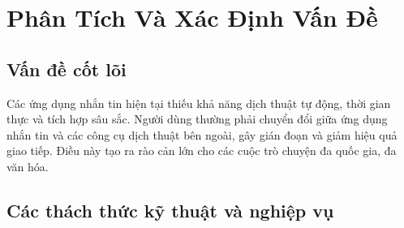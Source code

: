 \section{Phân Tích Và Xác Định Vấn Đề}

\subsection{Vấn đề cốt lõi}
Các ứng dụng nhắn tin hiện tại thiếu khả năng dịch thuật tự động, thời gian thực và tích hợp sâu sắc. Người dùng thường phải chuyển đổi giữa ứng dụng nhắn tin và các công cụ dịch thuật bên ngoài, gây gián đoạn và giảm hiệu quả giao tiếp. Điều này tạo ra rào cản lớn cho các cuộc trò chuyện đa quốc gia, đa văn hóa.

\subsection{Các thách thức kỹ thuật và nghiệp vụ}

